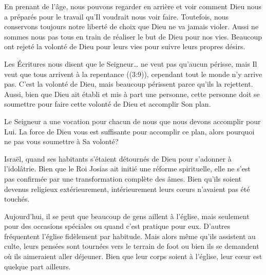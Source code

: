 En prenant de l'âge, nous pouvons regarder en arrière et voir
 comment Dieu nous a préparés pour le travail qu'Il voudrait nous voir faire.
 Toutefois, nous conservons toujours notre liberté de choix que Dieu
 ne va jamais violer. Aussi ne sommes nous pas tous en train de réaliser
 le but de Dieu pour nos vies. Beaucoup ont rejeté la volonté de Dieu
 pour leurs vies pour suivre leurs propres désirs. 


Les Écritures nous disent que \og le 
 Seigneur\dots{} ne veut pas qu'aucun périsse, mais Il veut que tous arrivent
 à la repentance \fg{} ((3:9)), cependant tout le monde
 n'y arrive pas. C'est la volonté de Dieu, mais beaucoup périssent
 parce qu'ils la rejettent. Aussi, bien que Dieu ait établi et mis à part
 une personne, cette personne doit se soumettre pour faire cette volonté
 de Dieu et accomplir Son plan. 

Le Seigneur a une vocation pour chacun de nous que nous devons accomplir
 pour Lui. La force de Dieu vous est suffisante pour accomplir ce plan,
 alors pourquoi ne pas vous soumettre à Sa volonté? 

\dvrule






 Israël,
 quand ses habitants s'étaient détournés de Dieu pour s'adonner
 à l'idolâtrie. Bien que le Roi Josias ait initié une réforme spirituelle,
 elle ne s'est pas confirmée par une transformation complète des âmes.
 Bien qu'ils soient devenus religieux extérieurement,
 intérieurement leurs cœurs n'avaient pas 
 été touchés. 

Aujourd'hui, il se peut que beaucoup de gens aillent à l'église,
 mais seulement pour des occasions spéciales ou quand c'est pratique pour eux.
 D'autres fréquentent l'église fidèlement \ocadr par habitude.
 Mais alors même qu'ils assistent au culte, leurs pensées sont tournées
 vers le terrain de foot ou bien ils se demandent où ils aimeraient
 aller déjeuner. Bien que leur corps soient à l'église,
 leur cœur est quelque part ailleurs. 

